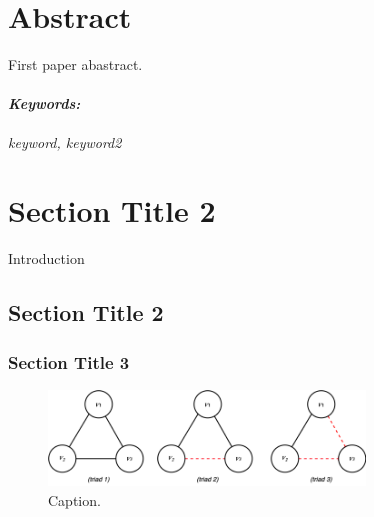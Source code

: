 \begin{onehalfspacing}

\section*{\centering Abstract}
First paper abastract.


\paragraph{\textit{\textbf{Keywords:}}} \textit{keyword, keyword2} 
 


\vspace{20pt} 

\section{Section Title 2}
\label{s-1-cc}
Introduction  \citet{heider1946attitudes} 
\citep{doreian1996partitioning}

\subsection{Section Title 2}

\blindtext

\subsubsection{Section Title 3}
\blindtext 

\begin{figure}[h]
    \centering
    \includegraphics[width=0.75\textwidth]{Figs/Chapter2/fig_exmp.png}
    \caption{Caption.}
\label{fig:1-cc}  
\end{figure}



\end{onehalfspacing}






